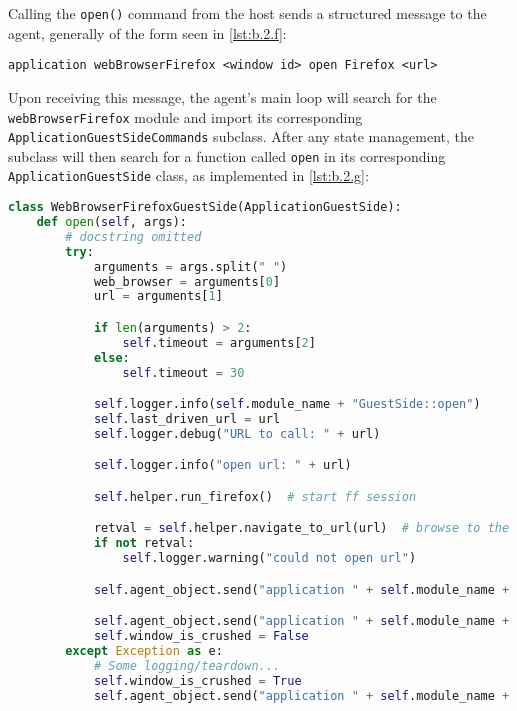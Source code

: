 Calling the \passthrough{\lstinline!open()!} command from the host sends
a structured message to the agent, generally of the form seen in
\autoref{lst:b.2.f}:

\begin{lstlisting}[label={lst:b.2.f}, caption={Sample ForTrace agent protocol message}, ]
application webBrowserFirefox <window id> open Firefox <url>
\end{lstlisting}

Upon receiving this message, the agent's main loop will search for the
\passthrough{\lstinline!webBrowserFirefox!} module and import its
corresponding \passthrough{\lstinline!ApplicationGuestSideCommands!}
subclass. After any state management, the subclass will then search for
a function called \passthrough{\lstinline!open!} in its corresponding
\passthrough{\lstinline!ApplicationGuestSide!} class, as implemented in
\autoref{lst:b.2.g}:

\begin{lstlisting}[label={lst:b.2.g}, caption={Corresponding ForTrace agent-side call }, language=Python]
class WebBrowserFirefoxGuestSide(ApplicationGuestSide):
    def open(self, args):
        # docstring omitted
        try:
            arguments = args.split(" ")
            web_browser = arguments[0]
            url = arguments[1]

            if len(arguments) > 2:
                self.timeout = arguments[2]
            else:
                self.timeout = 30

            self.logger.info(self.module_name + "GuestSide::open")
            self.last_driven_url = url
            self.logger.debug("URL to call: " + url)

            self.logger.info("open url: " + url)

            self.helper.run_firefox()  # start ff session

            retval = self.helper.navigate_to_url(url)  # browse to the specified url
            if not retval:
                self.logger.warning("could not open url")

            self.agent_object.send("application " + self.module_name + " " + str(self.window_id) + " opened")

            self.agent_object.send("application " + self.module_name + " " + str(self.window_id) + " ready")
            self.window_is_crushed = False
        except Exception as e:
            # Some logging/teardown...
            self.window_is_crushed = True
            self.agent_object.send("application " + self.module_name + " " + str(self.window_id) + " error")
\end{lstlisting}

